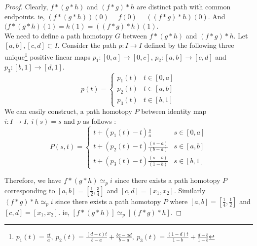 \begin{proof}
	Clearly, $f \ast (g \ast h)$ and $(f \ast g) \ast h$ are distinct path with common endpoints. ie, $(f \ast (g \ast h))(0) = f(0) = ((f \ast g) \ast h)(0)$. And $(f \ast (g \ast h)(1) = h(1) = ((f \ast g) \ast h)(1)$.\\

	We need to define a path homotopy $G$ between $f \ast (g \ast h)$ and $(f \ast g) \ast h$. Let $[a,b], [c,d] \subset I$. Consider the path $p : I \to I$ defined by the following three unique\footnote{$p_1(t) = \frac{ct}{a},\ p_2(t) = \frac{(d-c)t}{b-a}+\frac{bc-ad}{b-a},\ p_3(t) = \frac{(1-d)t}{1-b}+\frac{d-b}{1-b}$} positive linear maps $p_1 : [0,a] \to [0,c]$, $p_2 : [a,b] \to [c,d]$ and $p_3 : [b,1] \to [d,1]$.
	\[ p(t) = \begin{cases} p_1(t) & t \in [0,a] \\ p_2(t) & t \in [a,b] \\ p_3(t) & t \in [b,1] \end{cases} \]
	We can easily construct, a path homotopy $P$ between identity map $i : I \to I,\ i(s) = s$ and $p$ as follows :
	\[ P(s,t) = \begin{cases} t + (p_1(t)-t)\frac{s}{a} & s \in [0,a] \\ t + (p_2(t)-t)\frac{(s-a)}{(b-a)} & s \in [a,b] \\ t+(p_3(t)-t)\frac{(s-b)}{(1-b)} & s \in [b,1] \end{cases} \]

		Therefore, we have $f \ast (g \ast h) \simeq_p i$ since there exists a path homotopy $P$ corresponding to  $[a,b]=[\frac{1}{2},\frac{3}{4}]$ and $[c,d] = [x_1,x_2]$. Similarly $(f \ast g) \ast h \simeq_p i$ since there exists a path homotopy $P$ where $[a,b]=[\frac{1}{4},\frac{1}{2}]$ and $[c,d] = [x_1,x_2]$. ie, $[f \ast (g \ast h)] \simeq_p [(f \ast g) \ast h]$.
\end{proof}


